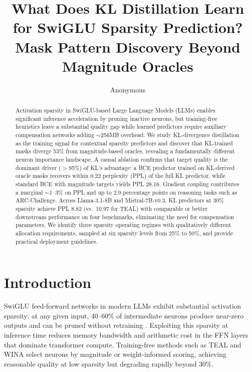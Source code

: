 \documentclass[11pt,a4paper]{article}
\title{What Does KL Distillation Learn for SwiGLU Sparsity Prediction?\\Mask Pattern Discovery Beyond Magnitude Oracles}
\author{Anonymous}
\date{}
\begin{document}
\maketitle

\begin{abstract}
Activation sparsity in SwiGLU-based Large Language Models (LLMs) enables significant inference acceleration by pruning inactive neurons, but training-free heuristics leave a substantial quality gap while learned predictors require auxiliary compensation networks adding ${\sim}$256MB overhead.
We study KL-divergence distillation as the training signal for contextual sparsity predictors and discover that KL-trained masks diverge 53\% from magnitude-based oracles, revealing a fundamentally different neuron importance landscape.
A causal ablation confirms that target quality is the dominant driver ($>$95\%) of KL's advantage: a BCE predictor trained on KL-derived oracle masks recovers within 0.22 perplexity (PPL) of the full KL predictor, while standard BCE with magnitude targets yields PPL 28.16.
Gradient coupling contributes a marginal ${\sim}$1--3\% on PPL and up to 2.9 percentage points on reasoning tasks such as ARC-Challenge.
Across Llama-3.1-8B and Mistral-7B-v0.3, KL predictors at 30\% sparsity achieve PPL 8.82 (vs.\ 10.97 for TEAL) with comparable or better downstream performance on four benchmarks, eliminating the need for compensation parameters.
We identify three sparsity operating regimes with qualitatively different allocation requirements, sampled at six sparsity levels from 25\% to 50\%, and provide practical deployment guidelines.
\end{abstract}

\section{Introduction}

SwiGLU feed-forward networks in modern LLMs exhibit substantial activation sparsity: at any given input, 40--60\% of intermediate neurons produce near-zero outputs and can be pruned without retraining \citep{liu2023deja,song2024prosparse}. Exploiting this sparsity at inference time reduces memory bandwidth and arithmetic cost in the FFN layers that dominate transformer compute. Training-free methods such as TEAL \citep{liu2024teal} and WINA \citep{huang2024wina} select neurons by magnitude or weight-informed scoring, achieving reasonable quality at low sparsity but degrading rapidly beyond 30\%.
\end{document}
